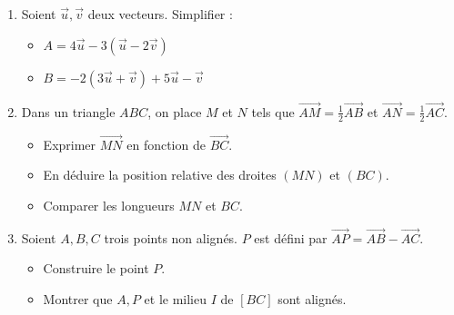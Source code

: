 \documentclass[11pt]{article}
\begin{document}
\begin{exercice}
\begin{enumerate}
\item Soient $\vec{u}, \vec{v}$ deux vecteurs. Simplifier :
      \begin{itemize}
      \item $A = 4\vec{u} - 3(\vec{u} - 2\vec{v})$
      \item $B = -2(3\vec{u} + \vec{v}) + 5\vec{u} - \vec{v}$
      \end{itemize}
\item Dans un triangle $ABC$, on place $M$ et $N$ tels que $\overrightarrow{AM} = \frac{1}{2}\overrightarrow{AB}$ et $\overrightarrow{AN} = \frac{1}{2}\overrightarrow{AC}$.
      \begin{itemize}
      \item Exprimer $\overrightarrow{MN}$ en fonction de $\overrightarrow{BC}$.
      \item En déduire la position relative des droites $(MN)$ et $(BC)$.
      \item Comparer les longueurs $MN$ et $BC$.
      \end{itemize}
\item Soient $A, B, C$ trois points non alignés. $P$ est défini par $\overrightarrow{AP} = \overrightarrow{AB} - \overrightarrow{AC}$.
      \begin{itemize}
      \item Construire le point $P$.
      \item Montrer que $A, P$ et le milieu $I$ de $[BC]$ sont alignés.
      \end{itemize}
\end{enumerate}
\end{exercice}
\end{document}
